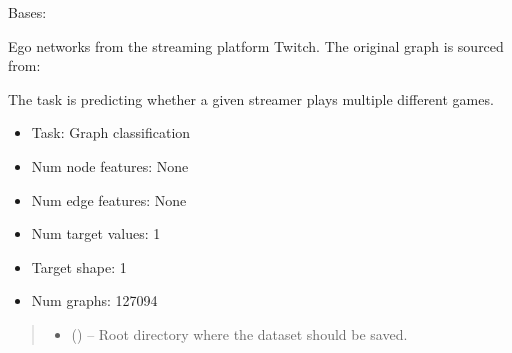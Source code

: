 \documentclass[letterpaper,10pt,english]{sphinxhowto}
\begin{document}
\begin{fulllineitems}
\label{\detokenize{datasets:datasets.EgoDataset}}
\pysigstartsignatures
{}
\pysigstopsignatures
\sphinxAtStartPar
Bases: 

\sphinxAtStartPar
Ego networks from the streaming platform Twitch.
The original graph is sourced from:
\begin{quote}

\sphinxAtStartPar
{}
\end{quote}

\sphinxAtStartPar
The task is predicting whether a given streamer plays multiple different games.
\begin{itemize}
\item {} 
\sphinxAtStartPar
Task: Graph classification

\item {} 
\sphinxAtStartPar
Num node features: None

\item {} 
\sphinxAtStartPar
Num edge features: None

\item {} 
\sphinxAtStartPar
Num target values: 1

\item {} 
\sphinxAtStartPar
Target shape: 1

\item {} 
\sphinxAtStartPar
Num graphs: 127094

\end{itemize}
\begin{quote}\begin{description}
\begin{itemize}
\item {} 
\sphinxAtStartPar
{} () – Root directory where the dataset should be saved.


\end{itemize}
\end{description}
\end{quote}
\end{fulllineitems}
\end{document}
